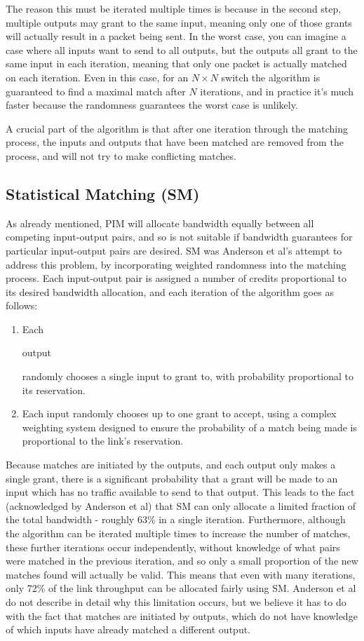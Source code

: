 The reason this must be iterated multiple times is because in the second step, multiple outputs may grant to the same input, meaning only one of those grants will actually result in a packet being sent. In the worst case, you can imagine a case where all inputs want to send to all outputs, but the outputs all grant to the same input in each iteration, meaning that only one packet is actually matched on each iteration. Even in this case, for an $N\times N$ switch the algorithm is guaranteed to find a maximal match after $N$ iterations, and in practice it's much faster because the randomness guarantees the worst case is unlikely.

A crucial part of the algorithm is that after one iteration through the matching process, the inputs and outputs that have been matched are removed from the process, and will not try to make conflicting matches.

\subsection{Statistical Matching (SM)}
As already mentioned, PIM will allocate bandwidth equally between all competing input-output pairs, and so is not suitable if bandwidth guarantees for particular input-output pairs are desired. SM was Anderson et al's attempt to address this problem, by incorporating weighted randomness into the matching process. Each input-output pair is assigned a number of credits proportional to its desired bandwidth allocation, and each iteration of the algorithm goes as follows:

\begin{enumerate}
 \item Each \begin{em}output\end{em} randomly chooses a single input to grant to, with probability proportional to its reservation.
 \item Each input randomly chooses up to one grant to accept, using a complex weighting system designed to ensure the probability of a match being made is proportional to the link's reservation.
\end{enumerate}

Because matches are initiated by the outputs, and each output only makes a single grant, there is a significant probability that a grant will be made to an input which has no traffic available to send to that output. This leads to the fact (acknowledged by Anderson et al) that SM can only allocate a limited fraction of the total bandwidth - roughly 63\% in a single iteration. Furthermore, although the algorithm can be iterated multiple times to increase the number of matches, these further iterations occur independently, without knowledge of what pairs were matched in the previous iteration, and so only a small proportion of the new matches found will actually be valid. This means that even with many iterations, only 72\% of the link throughput can be allocated fairly using SM. Anderson et al do not describe in detail why this limitation occurs, but we believe it has to do with the fact that matches are initiated by outputs, which do not have knowledge of which inputs have already matched a different output.

